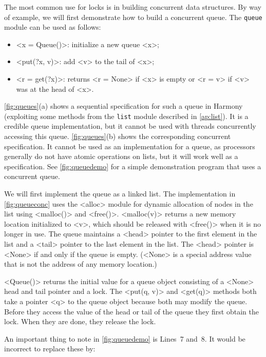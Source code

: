 \documentclass{report}
\begin{document}
The most common use for locks is in building concurrent data structures.
By way of example, we will first demonstrate how to build a concurrent queue.
The \texttt{queue} module can be used as follows:
\begin{itemize}
\item <{x = Queue()}>: initialize a new queue <{x}>;
\item <{put(?x, v)}>: add <{v}> to the tail of <{x}>;
\item <{r = get(?x)}>: returns <{r = None}>
if <{x}> is empty or <{r = v}> if <{v}> was at the head of <{x}>.
\end{itemize}

\noindent
\autoref{fig:queues}(a) shows a sequential specification for such a
queue in Harmony (exploiting some methods from the \texttt{list}
module described in \autoref{ap:list}).
It is a credible queue implementation,
but it cannot be used with threads concurrently accessing this queue.
\autoref{fig:queues}(b) shows the corresponding concurrent specification.
It cannot be used as an implementation for a queue, as processors generally
do not have atomic operations on lists, but it will work well as a
specification.
See \autoref{fig:queuedemo} for a simple demonstration program that uses
a concurrent queue.

We will first implement the queue as a linked list.
The implementation in \autoref{fig:queueconc}
uses the <{alloc}> module for dynamic allocation
%
of nodes in the list using <{malloc()}> and <{free()}>.
<{malloc(v)}> returns a new memory location initialized to <{v}>,
which should be released with <{free()}> when it is no longer in use.
The queue maintains a <{head}> pointer to the first element in the list
and a <{tail}> pointer to the last element in the list.
The <{head}> pointer is <{None}> if and only if the queue is empty.
(<{None}> is a special address value that is not the address of any
memory location.)

<{Queue()}> returns the initial value for a queue object
consisting of a <{None}> head and tail pointer and a lock.
The <{put(q, v)}> and <{get(q)}> methods both take a pointer <{q}> to the
queue object because both may modify the queue.
Before they access the value of the head or tail of the queue they first obtain
the lock.
When they are done, they release the lock.

An important thing to note in \autoref{fig:queuedemo}
is Lines~7 and~8.
It would be incorrect to replace these by:
\end{document}
